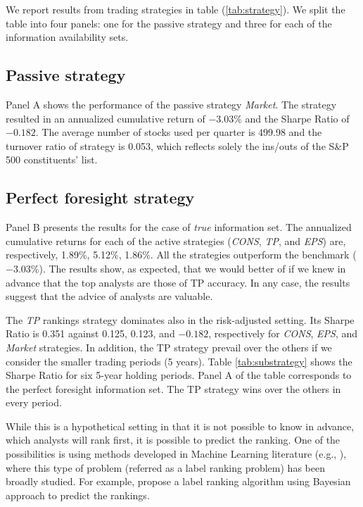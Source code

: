 \documentclass{article}\usepackage[]{graphicx}\usepackage[]{color}
\newcommand{\tr}{\textit{true}}
\begin{document}
We report results from trading strategies in table (\ref{tab:strategy}). We split the table into four panels: one for the passive strategy and three for each of the information availability sets. 

\subsection{Passive strategy}
Panel A shows  the performance of the passive strategy \textit{Market}. The strategy resulted in an annualized cumulative return of \ensuremath{-3.03}\% and the Sharpe Ratio  of \ensuremath{-0.182}. The average number of stocks used per quarter is 499.98 and the turnover ratio of strategy is 0.053, which reflects solely the ins/outs of the S\&P 500 constituents' list.

\subsection{Perfect foresight strategy}
\label{sec:perfect}
Panel B presents the results for the case of \tr{} information set. The annualized cumulative returns for each of the active strategies (\textit{CONS}, \textit{TP}, and \textit{EPS}) are, respectively, 1.89\%, 5.12\%, 1.86\%. All the strategies outperform the benchmark (\ensuremath{-3.03}\%). The results show, as expected, that  we would better of if we knew in advance that the top analysts are those of TP accuracy. In any case, the results suggest that the advice of analysts are valuable. 


The \textit{TP} rankings strategy dominates also in the risk-adjusted setting. Its Sharpe Ratio is 0.351 against 0.125, 0.123, and \ensuremath{-0.182}, respectively for \textit{CONS}, \textit{EPS}, and \textit{Market} strategies. In addition, the TP strategy prevail over the others if we consider the smaller trading periods (5 years). Table \ref{tab:substrategy} shows the Sharpe Ratio for six 5-year holding periods. Panel A of the table corresponds to the perfect foresight information set. The TP strategy wins over the others in every period.

While this is a hypothetical setting in that it is not possible to know in advance, which analysts will rank first, it is possible to predict the ranking. One of the possibilities is using methods developed in Machine Learning literature (e.g., \cite{aiguzhinov2010,brazdil2003}), where this type of problem (referred as a label ranking problem) has been broadly studied. For example, \cite{aiguzhinov2010} propose a label ranking algorithm using Bayesian approach to predict the rankings.
\end{document}
